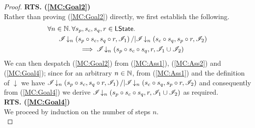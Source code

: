 \begin{lemma}
\begin{proof}
%	
%
%

\noindent\textbf{RTS. (\ref{MC:Goal2})} \\
Rather than proving (\ref{MC:Goal2}) directly, we first establish the following.
%
\begin{align}
	\for {n \in \Nats} \for{s_p, s_c, s_q, r \in \LStates} & \nonumber\\
	& \hspace{-4cm}\extendsAMUpto{\lmod}{n}{s_p \composeL s_c}{s_q \composeL r}{\lmod_1} /| \extendsAMUpto{\lmod}{n}{s_c \composeL s_q}{s_p \composeL r}{\lmod_2} \nonumber\\
	& \hspace{-3cm} \implies \extendsAMUpto{\lmod}{n}{s_p \composeL s_c \composeL s_q}{r}{\lmod_1 \cup \lmod_2} \label{MC:Goal4}
\end{align}
%
We can then despatch (\ref{MC:Goal2}) from (\ref{MC:Ass1}), (\ref{MC:Ass2}) and (\ref{MC:Goal4}); since for an arbitrary $n \in \mathbb{N}$, from (\ref{MC:Ass1}) and the definition of $\downarrow$ we have $\mathscr{I} \!\downarrow_{n} \left(s_p \circ s_c, s_q \circ r, \mathscr{I}_1\right) /| \mathscr{I} \!\downarrow_{n} \left(s_c \circ s_q, s_p \circ r, \mathscr{I}_2\right)$ and consequently from (\ref{MC:Goal4}) we derive $\mathscr{I} \!\downarrow_{n} \left(s_p \circ s_c \circ s_q, r, \mathscr{I}_1 \cup \mathscr{I}_2\right)$ as required. \\

\noindent\textbf{RTS. (\ref{MC:Goal4})} \\
We proceed by induction on the number of steps $n$.\\


\end{proof}
\end{lemma}
